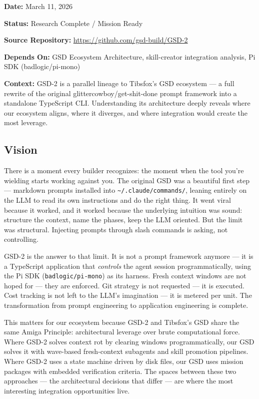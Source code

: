 \documentclass[11pt,letterpaper]{article}
\newcommand{\metafield}[2]{\textbf{\sffamily #1} #2\par}
\begin{document}
\metafield{Date:}{March 11, 2026}
\metafield{Status:}{Research Complete / Mission Ready}
\metafield{Source Repository:}{\url{https://github.com/gsd-build/GSD-2}}
\metafield{Depends On:}{GSD Ecosystem Architecture, skill-creator integration analysis, Pi SDK (badlogic/pi-mono)}
\metafield{Context:}{GSD-2 is a parallel lineage to Tibsfox's GSD ecosystem --- a full rewrite of the original glittercowboy/get-shit-done prompt framework into a standalone TypeScript CLI. Understanding its architecture deeply reveals where our ecosystem aligns, where it diverges, and where integration would create the most leverage.}

\subsection{Vision}

There is a moment every builder recognizes: the moment when the tool you're wielding starts working against you. The original GSD was a beautiful first step --- markdown prompts installed into \texttt{\textasciitilde/.claude/commands/}, leaning entirely on the LLM to read its own instructions and do the right thing. It went viral because it worked, and it worked because the underlying intuition was sound: structure the context, name the phases, keep the LLM oriented. But the limit was structural. Injecting prompts through slash commands is asking, not controlling.

GSD-2 is the answer to that limit. It is not a prompt framework anymore --- it is a TypeScript application that \emph{controls} the agent session programmatically, using the Pi SDK (\texttt{badlogic/pi-mono}) as its harness. Fresh context windows are not hoped for --- they are enforced. Git strategy is not requested --- it is executed. Cost tracking is not left to the LLM's imagination --- it is metered per unit. The transformation from prompt engineering to application engineering is complete.

This matters for our ecosystem because GSD-2 and Tibsfox's GSD share the same Amiga Principle: architectural leverage over brute computational force. Where GSD-2 solves context rot by clearing windows programmatically, our GSD solves it with wave-based fresh-context subagents and skill promotion pipelines. Where GSD-2 uses a state machine driven by disk files, our GSD uses mission packages with embedded verification criteria. The spaces between these two approaches --- the architectural decisions that differ --- are where the most interesting integration opportunities live.
\end{document}
